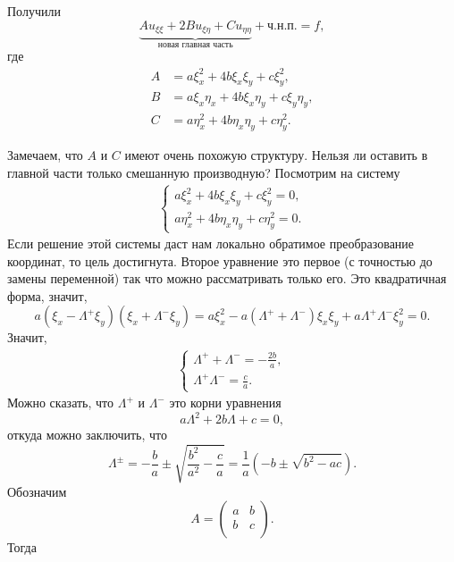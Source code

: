 Получили
$$\underbrace {A u_{\xi \xi} + 2B u_{\xi \eta} + C u_{\eta \eta}}_{\text{новая главная часть}} + \text{ч.н.п.} = f,$$
где \begin{align*}
	A &= a \xi^2_x + 4b \xi_x \xi_y + c \xi^2_y, \\
	B &= a \xi_x \eta_x + 4b \xi_x \eta_y + c \xi_y \eta_y, \\
	C &= a \eta^2_x + 4b \eta_x \eta_y + c \eta^2_y.
\end{align*}

Замечаем, что $A$ и $C$ имеют очень похожую структуру. Нельзя ли оставить в главной части только смешанную производную? Посмотрим на систему
\begin{align*}
	\begin{cases*}
	a \xi^2_x + 4b \xi_x \xi_y + c \xi^2_y = 0, \\
	a \eta^2_x + 4b \eta_x \eta_y + c \eta^2_y = 0.
	\end{cases*}
\end{align*}
Если решение этой системы даст нам локально обратимое преобразование координат, то цель достигнута. Второе уравнение это первое (с точностью до замены переменной) так что можно рассматривать только его. Это квадратичная форма, значит,
$$ a (\xi_x - \Lambda^+ \xi_y)(\xi_x + \Lambda^- \xi_y) = a \xi^2_x - a(\Lambda^+ + \Lambda^-)\xi_x \xi_y + a \Lambda^+ \Lambda^- \xi_y^2 =  0.$$
Значит,
\begin{align*}
	\begin{cases*}
		\Lambda^+ + \Lambda^- = - \frac {2b} {a}, \\
		\Lambda^+ \Lambda^- = \frac {c} {a}.
	\end{cases*}
\end{align*}
Можно сказать, что $\Lambda^+$ и $\Lambda^-$ это корни уравнения
$$a \Lambda^2 + 2b \Lambda + c = 0,$$
откуда можно заключить, что
$$ \Lambda^{\pm} = - \frac {b} {a} \pm \sqrt{\frac {b^2} {a^2} - \frac {c} {a}} = \frac {1} {a} (-b \pm \sqrt{b^2 - ac}).$$
Обозначим $$A = \begin{pmatrix} a & b \\ b & c \\\end{pmatrix}.$$
Тогда 
